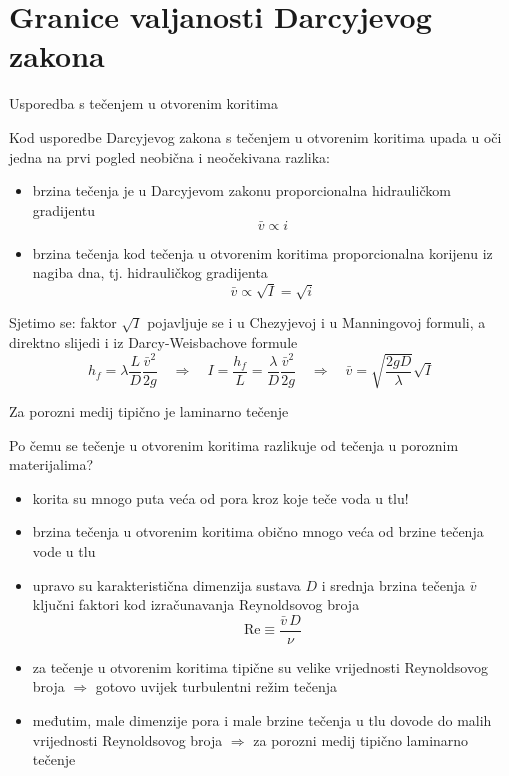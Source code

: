 \documentclass[croatian]{beamer}
\begin{document}
\section{Granice valjanosti Darcyjevog zakona}
\begin{frame}{Usporedba s tečenjem u otvorenim koritima}
\begin{block}{}
Kod usporedbe Darcyjevog zakona s tečenjem u otvorenim koritima upada
u oči jedna na prvi pogled neobična i neočekivana razlika:
\begin{itemize}
\item brzina tečenja je u Darcyjevom zakonu proporcionalna hidrauličkom
gradijentu 
\[
\bar{v}\propto i
\]
\item brzina tečenja kod tečenja u otvorenim koritima proporcionalna \alert{korijenu}
iz nagiba dna, tj. hidrauličkog gradijenta 
\[
\bar{v}\propto\sqrt{I}=\sqrt{i}
\]
\end{itemize}
\end{block}
Sjetimo se: faktor $\sqrt{I}$ pojavljuje se i u Chezyjevoj i u Manningovoj
formuli, a direktno slijedi i iz Darcy-Weisbachove formule 
\[
h_{f}=\lambda\frac{L}{D}\frac{\bar{v}^{2}}{2g}\quad\Rightarrow\quad I=\frac{h_{f}}{L}=\frac{\lambda}{D}\frac{\bar{v}^{2}}{2g}\quad\Rightarrow\quad\bar{v}=\sqrt{\frac{2gD}{\lambda}}\sqrt{I}
\]

\end{frame}
%
\begin{frame}{Za porozni medij tipično je laminarno tečenje}

Po čemu se tečenje u otvorenim koritima razlikuje od tečenja u poroznim
materijalima? 
\begin{itemize}
\item korita su mnogo puta veća od pora kroz koje teče voda u tlu! 
\item brzina tečenja u otvorenim koritima obično mnogo veća od brzine tečenja
vode u tlu 
\item upravo su karakteristična dimenzija sustava $D$ i srednja brzina
tečenja $\bar{v}$ ključni faktori kod izračunavanja Reynoldsovog
broja 
\[
\text{Re}\equiv\frac{\bar{v}\,D}{\nu}
\]
\item za tečenje u otvorenim koritima tipične su velike vrijednosti Reynoldsovog
broja $\Rightarrow$ gotovo uvijek turbulentni režim tečenja 
\item međutim, male dimenzije pora i male brzine tečenja u tlu dovode do
malih vrijednosti Reynoldsovog broja $\Rightarrow$ za porozni medij
tipično laminarno tečenje 
\end{itemize}
\end{frame}
\end{document}
